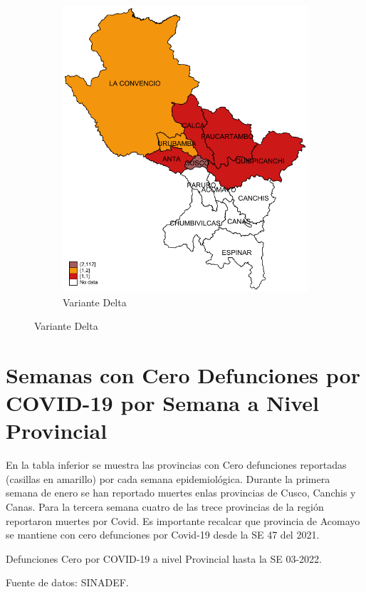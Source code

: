\documentclass[12pt,a4paper,openany]{book}
\begin{document}
\begin{figure}[h]
				\vspace{10mm}
				\begin{subfigure}[b]{0.40\textwidth}
					\centering
					\includegraphics[width=\textwidth]{../figuras/variantes_provincial_delta.pdf}
					\caption{Variante Delta}
				\end{subfigure}
			\end{figure}

\clearpage


\clearpage
	\section*{Semanas con Cero Defunciones por COVID-19 por Semana a Nivel Provincial}
	
	\noindent En la tabla inferior se muestra las provincias con Cero defunciones reportadas (casillas en amarillo) por cada semana epidemiológica. Durante la primera semana de enero se han reportado muertes enlas provincias de Cusco, Canchis y Canas. Para la tercera semana cuatro de las trece provincias de la región reportaron muertes por Covid. Es importante recalcar que provincia de Acomayo se mantiene con cero defunciones por Covid-19 desde la SE 47 del 2021.
	\begin{table}[h]		\caption{Defunciones Cero por COVID-19 a nivel Provincial hasta la SE 03-2022.}
		\resizebox{\textwidth}{!}{%
			
		}
		{\footnotesize {Fuente de datos: SINADEF.}}
	\end{table}
\pagebreak
\end{document}
